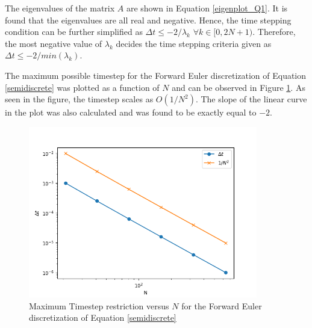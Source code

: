 \documentclass[12pt]{article}
\begin{document}
The eigenvalues of the matrix $A$ are shown in Equation \ref{eigenplot_Q1}. It is found that the eigenvalues are all real and negative. Hence, the time stepping condition can be further simplified as $\Delta t \leq -2 / \lambda_k$ $\forall k \in [0, 2N + 1)$. Therefore, the most negative value of $\lambda_k$ decides the time stepping criteria given as $\Delta t \leq -2/min(\lambda_k)$.

The maximum possible timestep for the Forward Euler discretization of Equation \ref{semidiscrete} was plotted as a function of $N$ and can be observed in Figure \ref{timestep_restrict_Q1}. As seen in the figure, the timestep scales as $O(1/N^2)$. The slope of the linear curve in the plot was also calculated and was found to be exactly equal to $-2$.
\begin{figure}
    \centering
    \includegraphics[width = 10cm]{dtvariation.png}
    \caption{Maximum Timestep restriction versus $N$ for the Forward Euler discretization of Equation \ref{semidiscrete} }
    \label{timestep_restrict_Q1}
\end{figure}
\end{document}
